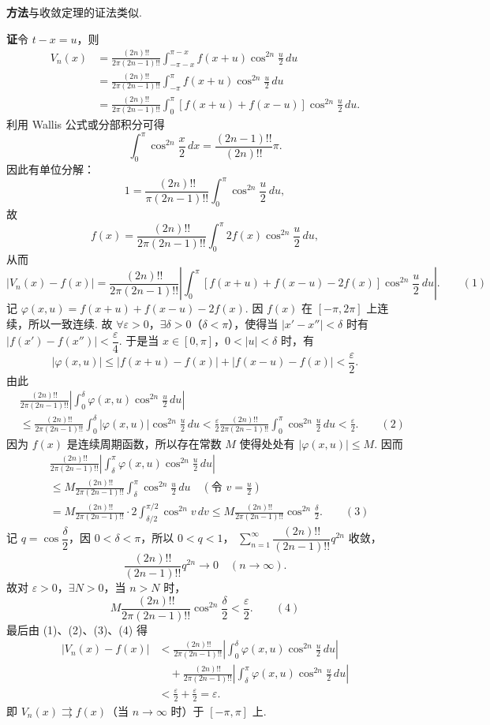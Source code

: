 \documentclass[UTF8,12pt,a4paper,fontset=fandol]{ctexart}
\begin{document}
\noindent\textbf{方法}\quad 与收敛定理的证法类似.

\noindent\textbf{证}\quad 令 $t-x=u$，则
\[
\begin{aligned}
V_n(x)&=\frac{(2n)!!}{2\pi(2n-1)!!}
\int_{-\pi-x}^{\pi-x}f(x+u)\cos^{2n}\frac u2\,du\\
&=\frac{(2n)!!}{2\pi(2n-1)!!}
\int_{-\pi}^{\pi}f(x+u)\cos^{2n}\frac u2\,du\\
&=\frac{(2n)!!}{2\pi(2n-1)!!}
\int_0^{\pi}[f(x+u)+f(x-u)]\cos^{2n}\frac u2\,du.
\end{aligned}
\]
利用 Wallis 公式或分部积分可得
\[
  \int_0^{\pi}\cos^{2n}\frac x2\,dx=\frac{(2n-1)!!}{(2n)!!}\pi.
\]
因此有单位分解：
\[
  1=\frac{(2n)!!}{\pi(2n-1)!!}\int_0^{\pi}\cos^{2n}\frac u2\,du,
\]
故
\[
  f(x)=\frac{(2n)!!}{2\pi(2n-1)!!}
  \int_0^{\pi}2f(x)\cos^{2n}\frac u2\,du,
\]
从而
\[
  |V_n(x)-f(x)|
  =\frac{(2n)!!}{2\pi(2n-1)!!}
  \left|\int_0^{\pi}[f(x+u)+f(x-u)-2f(x)]\cos^{2n}\frac u2\,du\right|. \qquad(1)
\]
记 $\varphi(x,u)=f(x+u)+f(x-u)-2f(x)$. 因 $f(x)$ 在 $[-\pi,2\pi]$ 上连续，所以一致连续. 故
$\forall\varepsilon>0$，$\exists\delta>0$（$\delta<\pi$），使得当 $|x'-x''|<\delta$ 时有
$|f(x')-f(x'')|<\dfrac{\varepsilon}{4}$. 于是当 $x\in[0,\pi]$，$0<|u|<\delta$ 时，有
\[
  |\varphi(x,u)|\le |f(x+u)-f(x)|+|f(x-u)-f(x)|<\frac{\varepsilon}{2}.
\]
由此
\[
\begin{aligned}
&\frac{(2n)!!}{2\pi(2n-1)!!}
\left|\int_0^{\delta}\varphi(x,u)\cos^{2n}\frac u2\,du\right|\\
&\le\frac{(2n)!!}{2\pi(2n-1)!!}
\int_0^{\delta}|\varphi(x,u)|\cos^{2n}\frac u2\,du
<\frac{\varepsilon}{2}\frac{(2n)!!}{2\pi(2n-1)!!}
\int_0^{\pi}\cos^{2n}\frac u2\,du<\frac{\varepsilon}{2}. \qquad(2)
\end{aligned}
\]
因为 $f(x)$ 是连续周期函数，所以存在常数 $M$ 使得处处有 $|\varphi(x,u)|\le M$. 因而
\[
\begin{aligned}
&\frac{(2n)!!}{2\pi(2n-1)!!}
\left|\int_{\delta}^{\pi}\varphi(x,u)\cos^{2n}\frac u2\,du\right|\\
&\le M\frac{(2n)!!}{2\pi(2n-1)!!}
\int_{\delta}^{\pi}\cos^{2n}\frac u2\,du
\quad\left(\text{令 }v=\frac u2\right)\\
&=M\frac{(2n)!!}{2\pi(2n-1)!!}
\cdot2\int_{\delta/2}^{\pi/2}\cos^{2n}v\,dv
\le M\frac{(2n)!!}{2\pi(2n-1)!!}\cos^{2n}\frac{\delta}{2}. \qquad(3)
\end{aligned}
\]
记 $q=\cos\dfrac{\delta}{2}$，因 $0<\delta<\pi$，所以 $0<q<1$，
$\displaystyle\sum_{n=1}^{\infty}\dfrac{(2n)!!}{(2n-1)!!}q^{2n}$ 收敛，
\[
  \frac{(2n)!!}{(2n-1)!!}q^{2n}\to0\quad(n\to\infty).
\]
故对 $\varepsilon>0$，$\exists N>0$，当 $n>N$ 时，
\[
  M\frac{(2n)!!}{2\pi(2n-1)!!}\cos^{2n}\frac{\delta}{2}<\frac{\varepsilon}{2}. \qquad(4)
\]
最后由 (1)、(2)、(3)、(4) 得
\[
\begin{aligned}
|V_n(x)-f(x)|
&<\frac{(2n)!!}{2\pi(2n-1)!!}
\left|\int_0^{\delta}\varphi(x,u)\cos^{2n}\frac u2\,du\right|\\
&\quad+\frac{(2n)!!}{2\pi(2n-1)!!}
\left|\int_{\delta}^{\pi}\varphi(x,u)\cos^{2n}\frac u2\,du\right|\\
&<\frac{\varepsilon}{2}+\frac{\varepsilon}{2}=\varepsilon.
\end{aligned}
\]
即 $V_n(x)\rightrightarrows f(x)$（当 $n\to\infty$ 时）于 $[-\pi,\pi]$ 上.
\end{document}
